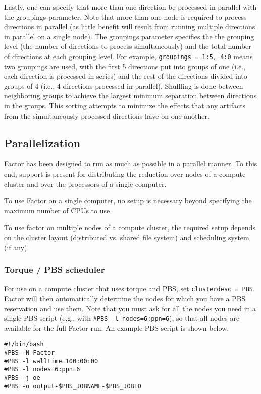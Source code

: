 \documentclass[structabstract]{article}
\begin{document}
{Lastly, one can specify that more than one direction be processed in parallel
with the groupings parameter. Note that more than one node is required to
process directions in parallel (as little benefit will result from running
multiple directions in parallel on a single node). The groupings parameter
specifies the the grouping level (the number of directions to process
simultaneously) and the total number of directions at each grouping level. For
example, {\tt groupings = 1:5, 4:0} means two groupings are used, with the first
5 directions put into groups of one (i.e., each direction is processed in
series) and the rest of the directions divided into groups of 4 (i.e., 4
directions processed in parallel). Shuffling is done between neighboring groups
to achieve the largest minimum separation between directions in the groups. This
sorting attempts to minimize the effects that any artifacts from the
simultaneously processed directions have on one another.


\subsection{Parallelization}
\label{factor:parallel}

Factor has been designed to run as much as possible in a parallel manner. To
this end, support is present for distributing the reduction over nodes of a
compute cluster and over the processors of a single computer.

To use Factor on a single computer, no setup is necessary beyond specifying the
maximum number of CPUs to use.

To use factor on multiple nodes of a compute cluster, the required setup depends
on the cluster layout (distributed vs. shared file system) and scheduling system
(if any).

\subsubsection{Torque / PBS scheduler}
For use on a compute cluster that uses torque and PBS, set {\tt clusterdesc =
PBS}. Factor will then automatically determine the nodes for which you have a
PBS reservation and use them. Note that you must ask for all the nodes you need
in a single PBS script (e.g., with {\tt #PBS -l nodes=6:ppn=6}), so that all
nodes are available for the full Factor run. An example PBS script is shown
below.

\begin{verbatim}
#!/bin/bash
#PBS -N Factor
#PBS -l walltime=100:00:00
#PBS -l nodes=6:ppn=6
#PBS -j oe
#PBS -o output-$PBS_JOBNAME-$PBS_JOBID


\end{verbatim}}
\end{document}
